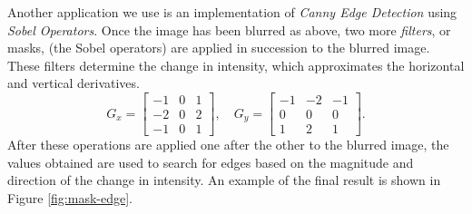 \documentclass[addpoints]{exam}
\begin{document}
Another application we use is an implementation of \textit{Canny Edge Detection} using \textit{Sobel Operators}. Once the image has been blurred as above, two more \textit{filters}, or masks, (the Sobel operators) are applied in succession to the blurred image. These filters determine the change in intensity, which approximates the horizontal and vertical derivatives.
\[
  G_x =   \left[
    \begin{array}{ccc}
      -1 & 0 & 1 \\
      -2 & 0 & 2 \\
      -1 & 0 & 1
    \end{array}
    \right], \quad
  G_y =   \left[
    \begin{array}{ccc}
      -1 & -2 & -1 \\
      0  & 0  & 0  \\
      1  & 2  & 1
    \end{array}
    \right].
\]
After these operations are applied one after the other to the blurred image, the values obtained are used to search for edges based on the magnitude and direction of the change in intensity. An example of the final result is shown in Figure \ref{fig:mask-edge}.
\end{document}
